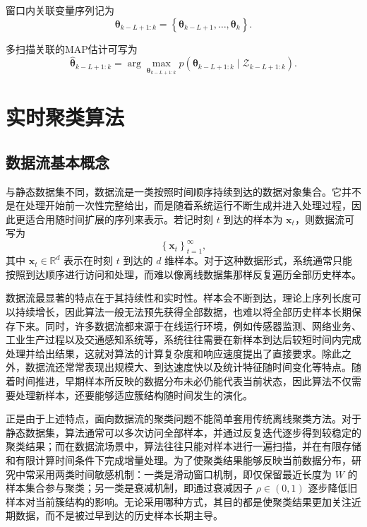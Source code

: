 \documentclass{xdupgthesis}
\begin{document}
窗口内关联变量序列记为
\begin{equation}
	\boldsymbol{\theta}_{k-L+1:k}
	=
	\left\{
	\boldsymbol{\theta}_{k-L+1},\ldots,\boldsymbol{\theta}_k
	\right\}.
\end{equation}

多扫描关联的MAP估计可写为
\begin{equation}
	\hat{\boldsymbol{\theta}}_{k-L+1:k}
	=
	\arg\max_{\boldsymbol{\theta}_{k-L+1:k}}
	p\left(
	\boldsymbol{\theta}_{k-L+1:k}
	\mid
	\mathcal{Z}_{k-L+1:k}
	\right).
\end{equation}

\section{实时聚类算法}

\subsection{数据流基本概念}

与静态数据集不同，数据流是一类按照时间顺序持续到达的数据对象集合。它并不是在处理开始前一次性完整给出，而是随着系统运行不断生成并进入处理过程，因此更适合用随时间扩展的序列来表示。若记时刻 $t$ 到达的样本为 $\mathbf{x}_t$，则数据流可写为
\begin{equation}
	\left\{\mathbf{x}_t\right\}_{t=1}^{\infty},
\end{equation}
其中 $\mathbf{x}_t\in\mathbb{R}^d$ 表示在时刻 $t$ 到达的 $d$ 维样本。对于这种数据形式，系统通常只能按照到达顺序进行访问和处理，而难以像离线数据集那样反复遍历全部历史样本。

数据流最显著的特点在于其持续性和实时性。样本会不断到达，理论上序列长度可以持续增长，因此算法一般无法预先获得全部数据，也难以将全部历史样本长期保存下来。同时，许多数据流都来源于在线运行环境，例如传感器监测、网络业务、工业生产过程以及交通感知系统等，系统往往需要在新样本到达后较短时间内完成处理并给出结果，这就对算法的计算复杂度和响应速度提出了直接要求。除此之外，数据流还常常表现出规模大、到达速度快以及统计特征随时间变化等特点。随着时间推进，早期样本所反映的数据分布未必仍能代表当前状态，因此算法不仅需要处理新样本，还要能够适应簇结构随时间发生的演化。

正是由于上述特点，面向数据流的聚类问题不能简单套用传统离线聚类方法。对于静态数据集，算法通常可以多次访问全部样本，并通过反复迭代逐步得到较稳定的聚类结果；而在数据流场景中，算法往往只能对样本进行一遍扫描，并在有限存储和有限计算时间条件下完成增量处理。为了使聚类结果能够反映当前数据分布，研究中常采用两类时间敏感机制：一类是滑动窗口机制，即仅保留最近长度为 $W$ 的样本集合参与聚类；另一类是衰减机制，即通过衰减因子 $\rho\in(0,1)$ 逐步降低旧样本对当前簇结构的影响。无论采用哪种方式，其目的都是使聚类结果更加关注近期数据，而不是被过早到达的历史样本长期主导。
\end{document}
